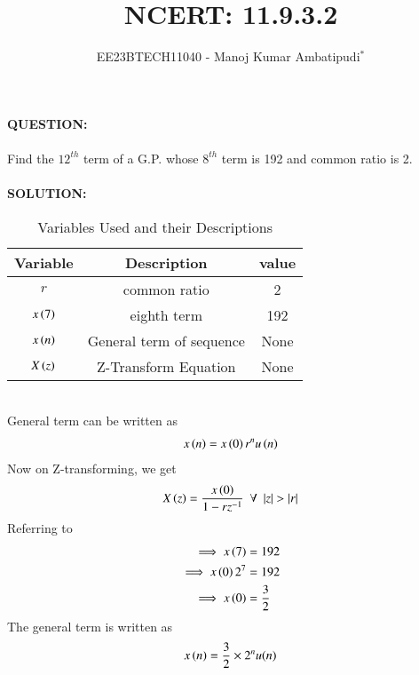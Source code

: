 \documentclass[journal,12pt,twocolumn]{IEEEtran}
\theoremstyle{remark}
\begin{document}

\vspace{3cm}
\title{NCERT: 11.9.3.2}
\author{EE23BTECH11040 - Manoj Kumar Ambatipudi$^{*}$%
}
\maketitle
\newpage
\bigskip
\renewcommand{\thefigure}{\theenumi}
\renewcommand{\thetable}{\theenumi}
\textbf{QUESTION:}\\\\
Find the $12^{th}$ term of a G.P. whose $8^{th}$ term is 192 and common ratio is 2.\\\\
\textbf{SOLUTION:}\\
\begin{table}[h!]
\renewcommand\thetable{1}
    \centering
    \begin{tabular}{|c|c|c|}
    \hline
        Variable&             Description&value\\\hline
             $r$&            common ratio&2    \\\hline
     $x\left(7\right)$&              eighth term&192  \\\hline
     $x\left(n\right)$&General term of sequence&None \\\hline
     $X\left(z\right)$&    Z-Transform Equation&None \\\hline
    \end{tabular}
    \vspace{0.3cm}
    \caption{Variables Used and their Descriptions}
    \label{table 11.9.3.2.1}
\end{table}
\\
General term can be written as 
\begin{align}
    x\left(n\right)=x\left(0\right)r^{n}u\left(n\right)\label{11.9.3.2.1}
\end{align}
Now on Z-transforming, we get
\begin{align}
    X\brak{z}=\dfrac{x\brak{0}}{1-rz^{-1}}\label{11.9.3.2.2} \,\,\, \forall \,\,\, |z|>|r|
\end{align}
Referring to 
\begin{align}
\implies     x\left(7\right)&=192\\
\implies x\left(0\right)2^{7}&=192\\
\implies x\left(0\right)&=\dfrac{3}{2}
\end{align}
The general term is written as
\begin{align}
    x\left(n\right)=\dfrac{3}{2}\times2^{n}u(n)
\end{align}
\end{document}
